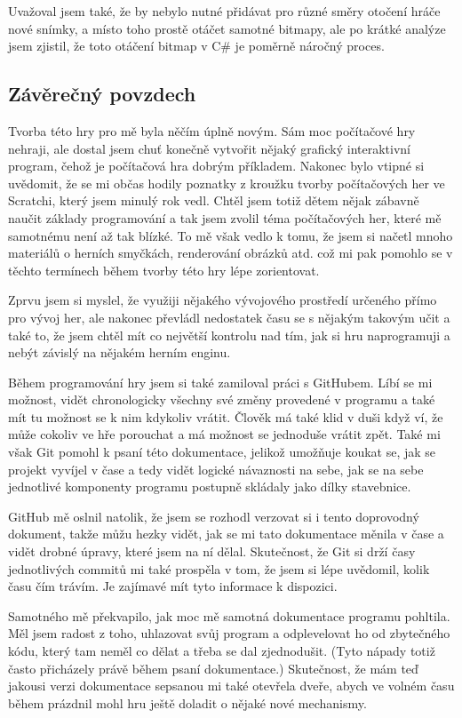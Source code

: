 \documentclass[a4]{article}
\begin{document}
Uvažoval jsem také, že by nebylo nutné přidávat pro různé směry otočení hráče nové snímky, a místo toho prostě otáčet samotné bitmapy, ale po krátké analýze jsem zjistil, že toto otáčení bitmap v C\# je poměrně náročný proces.

\subsection{Závěrečný povzdech}
Tvorba této hry pro mě byla něčím úplně novým. Sám moc počítačové hry nehraji, ale dostal jsem chuť konečně vytvořit nějaký grafický interaktivní program, čehož je počítačová hra dobrým příkladem. Nakonec bylo vtipné si uvědomit, že se mi občas hodily poznatky z kroužku tvorby počítačových her ve Scratchi, který jsem minulý rok vedl. Chtěl jsem totiž dětem nějak zábavně naučit základy programování a tak jsem zvolil téma počítačových her, které mě samotnému není až tak blízké. To mě však vedlo k tomu, že jsem si načetl mnoho materiálů o herních smyčkách, renderování obrázků atd. což mi pak pomohlo se v těchto termínech během tvorby této hry lépe zorientovat. 

Zprvu jsem si myslel, že využiji nějakého vývojového prostředí určeného přímo pro vývoj her, ale nakonec převládl nedostatek času se s nějakým takovým učit a také to, že jsem chtěl mít co největší kontrolu nad tím, jak si hru naprogramuji a nebýt závislý na nějakém herním enginu.

Během programování hry jsem si také zamiloval práci s GitHubem. Líbí se mi možnost, vidět chronologicky všechny své změny provedené v programu a také mít tu možnost se k nim kdykoliv vrátit. Člověk má také klid v duši když ví, že může cokoliv ve hře porouchat a má možnost se jednoduše vrátit zpět. Také mi však Git pomohl k psaní této dokumentace, jelikož umožňuje koukat se, jak se projekt vyvíjel v čase a tedy vidět logické návaznosti na sebe, jak se na sebe jednotlivé komponenty programu postupně skládaly jako dílky stavebnice.

GitHub mě oslnil natolik, že jsem se rozhodl verzovat si i tento doprovodný dokument, takže můžu hezky vidět, jak se mi tato dokumentace měnila v čase a vidět drobné úpravy, které jsem na ní dělal. Skutečnost, že Git si drží časy jednotlivých commitů mi také prospěla v tom, že jsem si lépe uvědomil, kolik času čím trávím. Je zajímavé mít tyto informace k dispozici.

Samotného mě překvapilo, jak moc mě samotná dokumentace programu pohltila. Měl jsem radost z toho, uhlazovat svůj program a odplevelovat ho od zbytečného kódu, který tam neměl co dělat a třeba se dal zjednodušit. (Tyto nápady totiž často přicházely právě během psaní dokumentace.) Skutečnost, že mám teď jakousi verzi dokumentace sepsanou mi také otevřela dveře, abych ve volném času během prázdnil mohl hru ještě doladit o nějaké nové mechanismy. 
\end{document}
